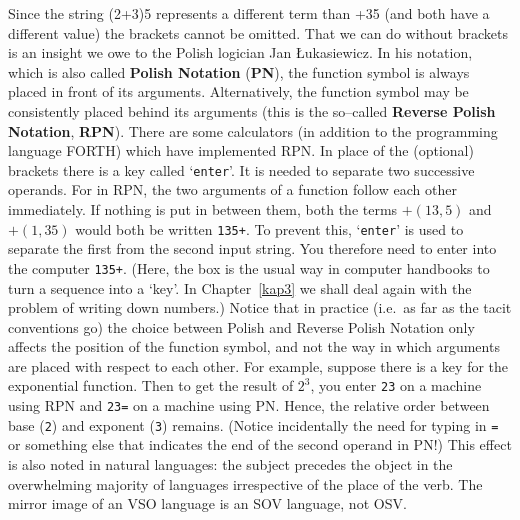 Since the string {\mtt (2+3)5} represents a different term
than {+35} (and both have a different value) the
brackets cannot be omitted. That we can do without brackets is an 
insight we owe to the Polish logician Jan {\L}ukasiewicz. In his 
notation, which is also called \textbf{Polish Notation} (\textbf{PN}), 
the function symbol is always placed in front of its arguments.
Alternatively, the function symbol may be consistently placed
behind its arguments (this is the so--called \textbf{Reverse Polish
Notation}, \textbf{RPN}). There are some calculators (in addition to the
programming language FORTH) 
which have implemented RPN. In place
of the (optional) brackets there is a key called  `{\tt enter}'.
It is needed to separate two successive operands. For in RPN,
the two arguments of a function follow each other immediately.
If nothing is put in between them, both the terms $+(13,5)$
and $+(1,35)$ would both be written {\tt 135+}. To prevent this,
`{\tt enter}' is used to separate the first from the second
input string. You therefore need to enter into the computer
{\tt 135+}. (Here, the box is the usual way
in computer handbooks to turn a sequence into a `key'.
In Chapter~\ref{kap3} we shall deal again with the problem
of writing down numbers.) Notice that in practice (i.e.~as far 
as the tacit conventions go) the choice between Polish and Reverse 
Polish Notation only affects the position of the function symbol, and 
not the way in which arguments are placed with respect to each other. 
For example, suppose there is a key  for the 
exponential function. Then to get the result of $2^3$, you enter
\mbox{\tt 23} on a machine using RPN  
and {\tt {}23=} on a machine using PN. 
Hence, the relative order between base ({\tt 2}) and exponent 
({\tt 3}) remains. (Notice incidentally the need for typing in 
{\tt =} or something else that indicates the end of the second 
operand in PN!) This effect is also noted in natural languages: 
the subject precedes the object in the overwhelming majority of 
languages irrespective of the place of the verb. The mirror image 
of an VSO language is an SOV language, not OSV.

